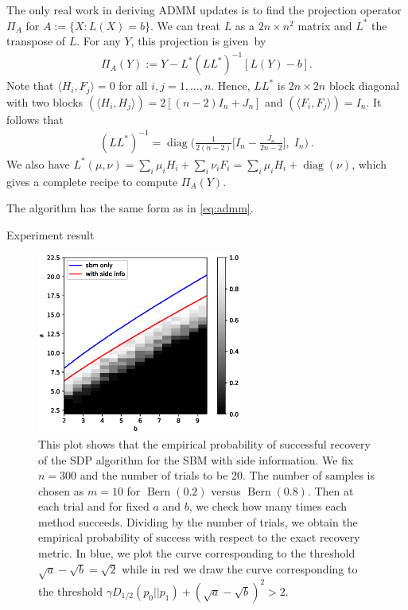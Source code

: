 \documentclass{article}
\DeclareMathOperator{\diag}{diag}
\DeclareMathOperator{\Bern}{Bern}
\begin{document}
The only real work in deriving ADMM updates is to find the projection operator $\Pi_{A}$ for $ A := \{X: L(X) = b\}$.
We can treat $L$ as a $2n \times n^2$ matrix and $L^*$ the transpose of $L$. 
For any $Y$, this projection is given~by 
\begin{align}\label{eq:proj:L:Y}
\Pi_{A}(Y) := Y - L^* (L L^*)^{-1}[ L(Y) - b] .
\end{align}
Note that $\langle H_i,F_j \rangle = 0$
for all $i,j = 1, \dots, n$.
Hence, $L L^*$ is $2n\times 2n$ block diagonal with two blocks $(\langle H_i,H_j \rangle) = 2[(n-2) I_n + J_n]$ and 
$(\langle F_i,F_j \rangle) = I_n$. It follows that
\begin{align*}
(LL^*)^{-1} = \diag\Big(\frac{1}{2(n-2)} 
\big[ I_n - \frac{J_n}{2n-2} \big],\; I_n \Big) \ . 
\end{align*}
We also have $L^*(\mu,\nu) = \sum_i \mu_i H_i + \sum_i \nu_i F_i =
\sum_i \mu_i H_i + \diag(\nu)$, which gives a complete
recipe to compute $\Pi_{A}(Y)$.

The algorithm has the same form as in \eqref{eq:admm}.

Experiment result
\begin{figure}
	\centering
	\includegraphics[width=0.6\textwidth]{sdp_si.eps}
	\caption{This plot shows that the empirical probability of successful recovery of the SDP algorithm 
	for the SBM with side information. We fix $n=300$ and the number of trials to be 20. The number of samples is chosen as $m=10$ for $\Bern(0.2)$ versus $\Bern(0.8)$. Then
	at each trial and for fixed $a$ and $b$, we check how many times each method succeeds. Dividing
	by the number of trials, we obtain the empirical probability of success with respect to
	the exact recovery metric. In blue, we plot the curve corresponding to the threshold $\sqrt{a}-\sqrt{b}=\sqrt{2}$ while in red we draw the curve corresponding to the threshold $\gamma D_{1/2}(p_0||p_1)  + (\sqrt{a} - \sqrt{b})^2 > 2$.}
\end{figure}
\end{document}
